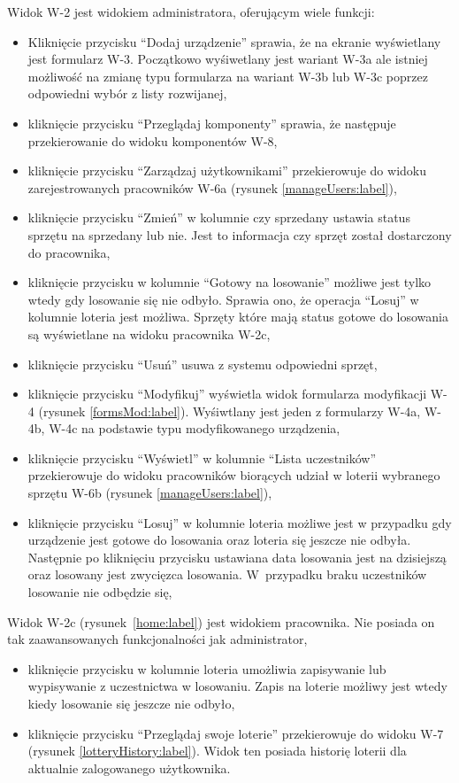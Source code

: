 Widok W-2 jest widokiem administratora, oferującym wiele funkcji:
\begin{itemize}
	\item Kliknięcie przycisku "`Dodaj urządzenie"' sprawia, że na ekranie wyświetlany jest formularz W-3. Początkowo wyśiwetlany jest wariant W-3a ale istniej możliwość na zmianę typu formularza na wariant  W-3b lub W-3c poprzez odpowiedni wybór z listy rozwijanej,
	\item kliknięcie przycisku "`Przeglądaj komponenty"' sprawia, że następuje przekierowanie do widoku komponentów W-8,
	\item kliknięcie przycisku "`Zarządzaj użytkownikami"' przekierowuje do widoku zarejestrowanych pracowników W-6a (rysunek \ref{manageUsers:label}),
	\item kliknięcie przycisku "`Zmień"' w kolumnie czy sprzedany ustawia status sprzętu na sprzedany lub nie. Jest to informacja czy sprzęt został dostarczony do pracownika,
	\item kliknięcie przycisku w kolumnie "`Gotowy na losowanie"' możliwe jest tylko wtedy gdy losowanie się nie odbyło. Sprawia ono, że operacja "`Losuj"' w kolumnie loteria jest możliwa. Sprzęty które mają status gotowe do losowania są wyświetlane na widoku pracownika W-2c,
	\item kliknięcie przycisku "`Usuń"' usuwa z systemu odpowiedni sprzęt,
	\item kliknięcie przycisku "`Modyfikuj"' wyświetla widok formularza modyfikacji W-4 (rysunek \ref{formsMod:label}). Wyśiwtlany jest jeden z formularzy W-4a, W-4b, W-4c na podstawie typu modyfikowanego urządzenia,
	\item kliknięcie przycisku "`Wyświetl"' w kolumnie "`Lista uczestników"' przekierowuje do widoku pracowników biorących udział w loterii wybranego sprzętu W-6b (rysunek \ref{manageUsers:label}),
	\item kliknięcie przycisku "`Losuj"' w kolumnie loteria możliwe jest w przypadku gdy urządzenie jest gotowe do losowania oraz loteria się jeszcze nie odbyła. Następnie po kliknięciu przycisku ustawiana data losowania jest na dzisiejszą oraz losowany jest zwycięzca losowania. W~przypadku braku uczestników losowanie nie odbędzie się,
\end{itemize}
Widok W-2c (rysunek~\ref{home:label}) jest widokiem pracownika. Nie posiada on tak zaawansowanych funkcjonalności jak administrator, 
\begin{itemize}
	\item kliknięcie przycisku w kolumnie loteria umożliwia zapisywanie lub wypisywanie z uczestnictwa w losowaniu. Zapis na loterie możliwy jest wtedy kiedy losowanie się jeszcze nie odbyło,
	\item kliknięcie przycisku "`Przeglądaj swoje loterie"' przekierowuje do widoku W-7 (rysunek \ref{lotteryHistory:label}). Widok ten posiada historię loterii dla aktualnie zalogowanego użytkownika.
\end{itemize}


